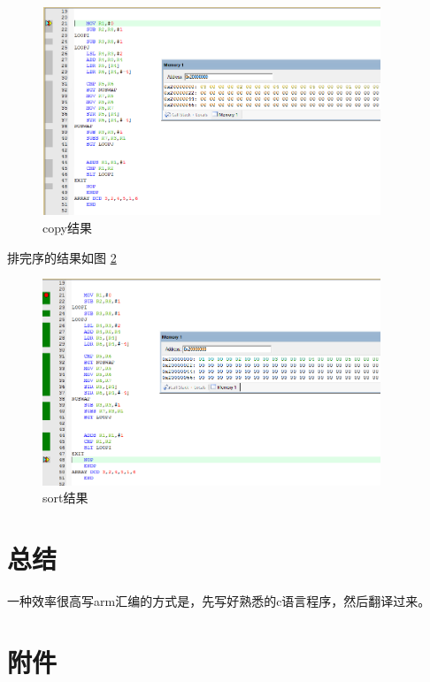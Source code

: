 \documentclass[a4paper,10pt,UTF8]{paper}
\numberwithin{equation}{section}
\numberwithin{figure}{section}
\begin{document}
\begin{figure}[h]
  \centering
  \includegraphics[width=0.9\textwidth]{2.PNG}
  \caption{copy结果}
  \label{fig:2}
\end{figure}

排完序的结果如图 \ref{fig:3}

\begin{figure}[h]
  \centering
  \includegraphics[width=0.9\textwidth]{3.PNG}
  \caption{sort结果}
  \label{fig:3}
\end{figure}

\section{总结}

一种效率很高写arm汇编的方式是，先写好熟悉的c语言程序，然后翻译过来。

\section{附件}
\end{document}
